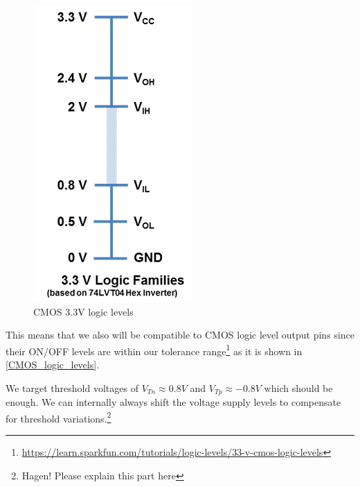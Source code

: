 \begin{figure}[H]
	\centering
	\includegraphics[scale=0.5]{cmos_3v3.png}
	\caption{CMOS 3.3V logic levels}
	\label{CMOS_logic_levels}
\end{figure}

This means that we also will be compatible to CMOS logic level output pins since their ON/OFF levels are within our tolerance range\footnote{\url{https://learn.sparkfun.com/tutorials/logic-levels/33-v-cmos-logic-levels}} as it is shown in \autoref{CMOS_logic_levels}.

We target threshold voltages of $V_{Tn} \approx 0.8V$ and $V_{Tp} \approx -0.8V$ which should be enough.
We can internally always shift the voltage supply levels to compensate for threshold variations.\footnote{Hagen! Please explain this part here}